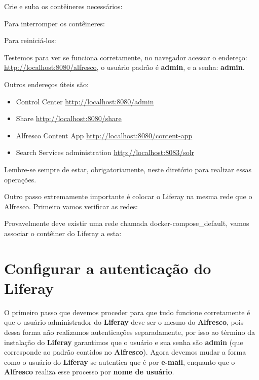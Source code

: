 \documentclass[a4paper,11pt]{article}
\begin{document}
Crie e suba os contêineres necessários: \\

Para interromper os contêineres: \\

Para reiniciá-los: \\

Testemos para ver se funciona corretamente, no navegador acessar o endereço: \url{http://localhost:8080/alfresco}, o usuário padrão é \textbf{admin}, e a senha: \textbf{admin}.

Outros endereços úteis são: \vspace{-1em}
\begin{itemize}
	\item Control Center \url{http://localhost:8080/admin}
	\item Share \url{http://localhost:8080/share}
	\item Alfresco Content App \url{http://localhost:8080/content-app}
	\item Search Services administration \url{http://localhost:8083/solr}
\end{itemize}

Lembre-se sempre de estar, obrigatoriamente, neste diretório para realizar essas operações.

Outro passo extremamente importante é colocar o Liferay na mesma rede que o Alfresco. Primeiro vamos verificar as redes: \\

Provavelmente deve existir uma rede chamada docker-compose\_default, vamos associar o contêiner do Liferay a esta: \\

\section{Configurar a autenticação do Liferay}
O primeiro passo que devemos proceder para que tudo funcione corretamente é que o usuário administrador do \textbf{Liferay} deve ser o mesmo do \textbf{Alfresco}, pois dessa forma não realizamos autenticações separadamente, por isso ao término da instalação do \textbf{Liferay} garantimos que o usuário e sua senha são \textbf{admin} (que corresponde ao padrão contidos no \textbf{Alfresco}). Agora devemos mudar a forma como o usuário do \textbf{Liferay} se autentica que é por \textbf{e-mail}, enquanto que o \textbf{Alfresco} realiza esse processo por \textbf{nome de usuário}.
\end{document}
